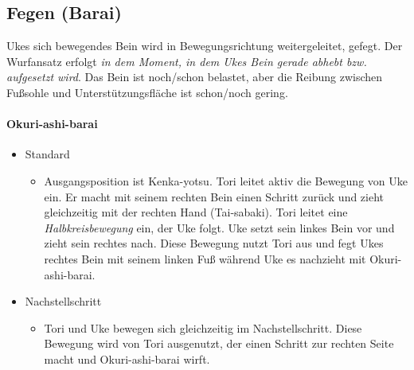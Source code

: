 \documentclass[justified, a4paper, notitlepage, captions=tableheading, nobib]{tufte-handout}
\begin{document}
\subsection{Fegen (Barai) }
\label{sec:orgf489a38}
Ukes sich bewegendes Bein wird in Bewegungsrichtung weitergeleitet, gefegt. 
Der Wurfansatz erfolgt \emph{in dem Moment, in dem Ukes Bein gerade abhebt bzw. aufgesetzt wird}. 
Das Bein ist noch/schon belastet, aber die Reibung zwischen Fußsohle und Unterstützungsfläche ist schon/noch gering.

\paragraph{Okuri-ashi-barai }
\label{sec:org2c1c46e}
\begin{itemize}
\item Standard
\begin{itemize}
\item Ausgangsposition ist Kenka-yotsu. Tori leitet aktiv die Bewegung von Uke ein. Er macht mit seinem rechten Bein einen Schritt zurück und zieht gleichzeitig mit der rechten Hand (Tai-sabaki). Tori leitet eine \emph{Halbkreisbewegung} ein, der Uke folgt. Uke setzt sein linkes Bein vor und zieht sein rechtes nach. Diese Bewegung nutzt Tori aus und fegt Ukes rechtes Bein mit seinem linken Fuß während Uke es nachzieht mit Okuri-ashi-barai.
\end{itemize}
\item Nachstellschritt
\begin{itemize}
\item Tori und Uke bewegen sich gleichzeitig im Nachstellschritt. Diese Bewegung wird von Tori ausgenutzt, der einen Schritt zur rechten Seite macht und Okuri-ashi-barai wirft.
\end{itemize}
\end{itemize}
\end{document}
